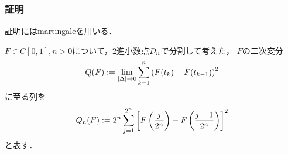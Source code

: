 \documentclass[uplatex,dvipdfmx]{jsreport}
\begin{document}
\subsubsection{証明}

\begin{tcolorbox}[colframe=ForestGreen, colback=ForestGreen!10!white,breakable,colbacktitle=ForestGreen!40!white,coltitle=black,fonttitle=\bfseries\sffamily,
title=]
    証明にはmartingaleを用いる．
\end{tcolorbox}

\begin{notation}
    $F\in C[0,1],n>0$について，2進小数点$\mathcal{D}_n$で分割して考えた，
    $F$の二次変分
    \[Q(F):=\lim_{\lvert\Delta\rvert\to0}\sum_{k=1}^n\left(F(t_k)-F(t_{k-1})\right)^2\]
    に至る列を
    \[Q_n(F):=2^n\sum^{2^n}_{j=1}\left[F\left(\frac{j}{2^n}\right)-F\left(\frac{j-1}{2^n}\right)\right]^2\]
    と表す．
\end{notation}
\end{document}
